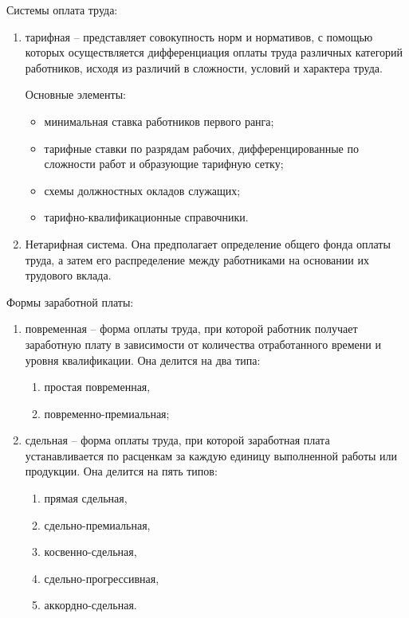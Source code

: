 Системы оплата труда:
\begin{enumerate}
    \item тарифная -- представляет совокупность норм и нормативов, с помощью
    которых осуществляется дифференциация оплаты труда различных категорий
    работников, исходя из различий в сложности, условий и характера труда.
    
    Основные элементы:
    \begin{itemize}
        \item минимальная ставка работников первого ранга;
        \item тарифные ставки по разрядам рабочих, дифференцированные по
            сложности работ и образующие тарифную сетку;
        \item схемы должностных окладов служащих;
        \item тарифно-квалификационные справочники.
    \end{itemize}
    
    \item Нетарифная система. Она предполагает определение общего фонда
        оплаты труда, а затем его распределение между работниками на основании
        их трудового вклада.
\end{enumerate}

Формы заработной платы:
\begin{enumerate}
    \item повременная -- форма оплаты труда, при которой работник получает
        заработную плату в зависимости от количества отработанного времени и
        уровня квалификации. Она делится на два типа:
    \begin{enumerate}
        \item простая повременная,
        \item повременно-премиальная;
    \end{enumerate}
    
    \item сдельная -- форма оплаты труда, при которой заработная плата
        устанавливается по расценкам за каждую единицу выполненной работы или
        продукции. Она делится на пять типов:
    \begin{enumerate}
        \item прямая сдельная,
        \item сдельно-премиальная,
        \item косвенно-сдельная,
        \item сдельно-прогрессивная,
        \item аккордно-сдельная.
    \end{enumerate}
\end{enumerate}

